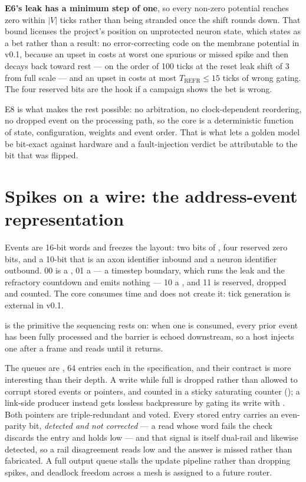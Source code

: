 \textbf{E6's leak has a minimum step of one}, so every non-zero
potential reaches zero within $|V|$ ticks rather than being stranded
once the shift rounds down. That bound licenses the project's position
on unprotected neuron state, which  states as a
bet rather than a result: no error-correcting code on the membrane
potential in v0.1, because an upset in  costs at worst one
spurious or missed spike and then decays back toward rest --- on the
order of 100 ticks at the reset leak shift of 3 from full scale --- and
an upset in  costs at most $T_{\mathrm{REFR}} \leq 15$ ticks of
wrong gating. The four reserved bits are the hook if a campaign shows
the bet is wrong.

E8 is what makes the rest possible: no arbitration, no clock-dependent
reordering, no dropped event on the processing path, so the core is a
deterministic function of state, configuration, weights and event
order. That is what lets a golden model be bit-exact against hardware
and a fault-injection verdict be attributable to the bit that was
flipped.

\section{Spikes on a wire: the address-event representation}

Events are 16-bit words and  freezes the layout:
two bits of , four reserved zero bits, and a 10-bit
 that is an axon identifier inbound and a neuron identifier
outbound.  00 is a , 01 a  --- a
timestep boundary, which runs the leak and the refractory countdown and
emits nothing --- 10 a , and 11 is reserved, dropped and
counted. The core consumes time and does not create it: tick generation
is external in v0.1.

 is the primitive the sequencing rests on: when one is
consumed, every prior event has been fully processed and the barrier is
echoed downstream, so a host injects one after a frame and reads until
it returns.

The queues are , 64 entries each in the
specification, and their contract is more interesting than their depth.
A write while full is dropped rather than allowed to corrupt stored
events or pointers, and counted in a sticky saturating counter
(); a link-side producer instead gets lossless
backpressure by gating its write with . Both pointers are
triple-redundant and voted. Every stored entry carries an even-parity
bit, \emph{detected and not corrected} --- a read whose word fails the
check discards the entry and holds  low --- and that
signal is itself dual-rail and likewise detected, so a rail
disagreement reads low and the answer is missed rather than fabricated.
A full output queue stalls the update pipeline rather than dropping
spikes, and deadlock freedom across a mesh is assigned to a future
router.

